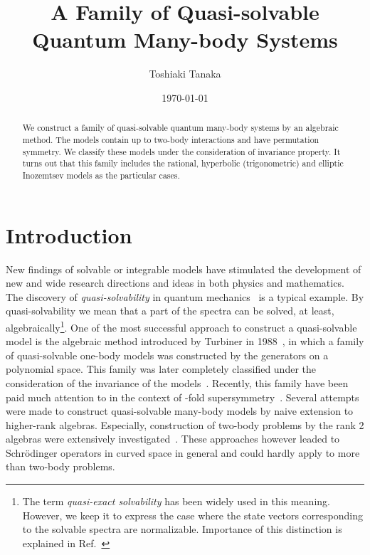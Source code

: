 \documentclass[a4paper,preprint,amsfonts,amssymb,amsmath,%
tightenlines,nofootinbib,noshowpacs]{revtex4}
\providecommand{\cN}{\mathcal{N}}
\providecommand{\bbR}{\mathbb{R}}
\providecommand{\Lsl}{\mathfrak{sl}}
\begin{document}
\title{A Family of Quasi-solvable Quantum Many-body Systems}

\author{Toshiaki Tanaka}


\date{\today}

\begin{abstract}
We construct a family of quasi-solvable quantum many-body systems
by an algebraic method. The models contain up to two-body interactions
and have permutation symmetry. We classify these models under the
consideration of invariance property. It turns out that this family
includes the rational, hyperbolic (trigonometric) and elliptic
Inozemtsev models as the particular cases.
\end{abstract}




\maketitle%


\section{\label{sec:intro}Introduction}

New findings of solvable or integrable models have stimulated
the development of new and wide research directions and ideas
in both physics and mathematics.
The discovery of \textit{quasi-solvability} in quantum
mechanics~\cite{TuUs1} is a typical example.
By quasi-solvability we mean that a part of the spectra can be
solved, at least, algebraically\footnote{The term \textit{
quasi-exact solvability} has been widely used in this meaning.
However, we keep it to express the case where the state vectors
corresponding to the solvable spectra are normalizable. Importance
of this distinction is explained in Ref.~\cite{AST2,ST1}}.
One of the most successful approach to construct a quasi-solvable
model is the algebraic method
introduced by Turbiner in 1988~\cite{Turbi1}, in which
a family of quasi-solvable one-body models was constructed by
the \myHighlight{$\Lsl(2)$}\coordHE{} generators on a polynomial space. This family was
later completely classified under the consideration of the
\myHighlight{$GL(2,\bbR)$}\coordHE{} invariance of the models~\cite{LoKaOl3,LoKaOl4}.
Recently, this family have been paid much attention to in the context
of \myHighlight{$\cN$}\coordHE{}-fold supersymmetry~\cite{AKOSW2,ASTY,AST1,KlPl2,KlPl3,%
DoDuTa1,DoDuTa2,AST2,ANST1,ANST2,ST1}.
Several attempts were made to construct quasi-solvable many-body
models by naive extension to higher-rank algebras. Especially,
construction of two-body problems by the rank 2 algebras were
extensively investigated~\cite{LoKaOl4,ShTu1,Shifm1,LoKaOl1,%
LoKaOl2,Turbi2,Ushve}.
These approaches however leaded to Schr\"{o}dinger operators
in curved space in general and could hardly apply to more than
two-body problems.
\end{document}

